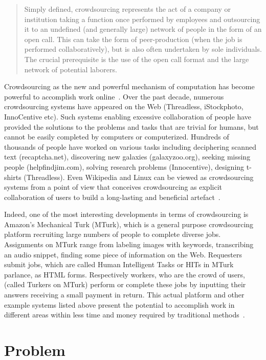\begin{quotation}
Simply defined, crowdsourcing represents the act of a company or institution taking 
a function once performed by employees and outsourcing it to an undefined 
(and generally large) network of people in the form of an open call. This can take 
the form of peer-production (when the job is performed collaboratively), but is also 
often undertaken by sole individuals. The crucial prerequisite is the use of the open 
call format and the large network of potential laborers.~\cite{Howe2006a}
\end{quotation}

Crowdsourcing as the new and powerful mechanism of computation has become 
powerful to accomplish work online~\cite{Kittur2011}. Over the past decade, numerous 
crowdsourcing systems have appeared on the Web (Threadless, iStockphoto, 
InnoCentive etc). Such systems enabling excessive collaboration of people have 
provided the solutions to the problems and tasks that are trivial for humans, but 
cannot be easily completed by computers or computerized. Hundreds of thousands 
of people have worked on various tasks including deciphering scanned text (recaptcha.net), 
discovering new galaxies (galaxyzoo.org), seeking missing people (helpfindjim.com), 
solving research problems (Innocentive), designing t-shirts (Threadless). Even 
Wikipedia and Linux can be viewed as crowdsourcing systems from a point of view that
conceives crowdsourcing as explicit collaboration of users to 
build a long-lasting and beneficial artefact~\cite{Doan2011}.

Indeed, one of the most interesting developments in terms of crowdsourcing is 
Amazon's Mechanical Turk (MTurk), which is a general purpose crowdsourcing platform 
recruiting large numbers of people to complete diverse jobs. Assignments on MTurk 
range from labeling images with keywords, transcribing an audio snippet, finding some 
piece of information on the Web. Requesters submit jobs, which are called Human 
Intelligent Tasks or HITs in MTurk parlance, as HTML forms. Respectively workers, 
who are the crowd of users, (called Turkers on MTurk) perform or complete these 
jobs by inputting their answers receiving a small payment in return. This actual 
platform and other example systems listed above present the potential to accomplish 
work in different areas within less time and money required by traditional 
methods~\cite{Minder2012, Marcus2011}.


\section{Problem}
\label{sec:problem}

